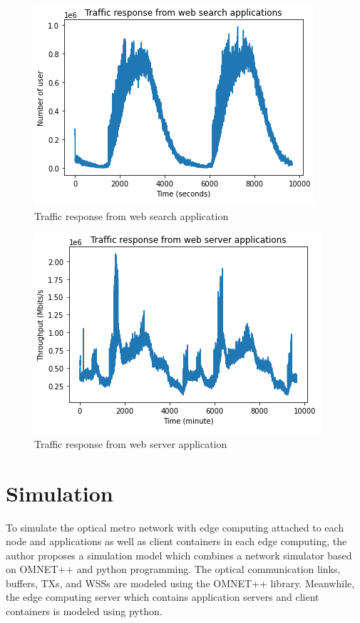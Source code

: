 \documentclass[conference]{IEEEtran}
\begin{document}
\begin{figure}[]
    \centering
        \includegraphics[scale = 0.8]{imgs/search_server_response.png}
        \caption{Traffic response from web search application}
        \label{fig:search_resp}
    \end{figure}

\begin{figure}[]
    \centering
        \includegraphics[scale = 0.8]{imgs/web_server_response.png}
        \caption{Traffic response from web server application}
        \label{fig:serving_resp}
    \end{figure}


\section{Simulation}
\label{sec:Simulation}

To simulate the optical metro network with edge computing attached to each node and applications as well as client containers in each edge computing, the author proposes a simulation model which combines a network simulator based on OMNET++ and python programming. The optical communication links, buffers, TXs, and WSSs are modeled using the OMNET++ library. Meanwhile, the edge computing server which contains application servers and client containers is modeled using python. 
\end{document}
